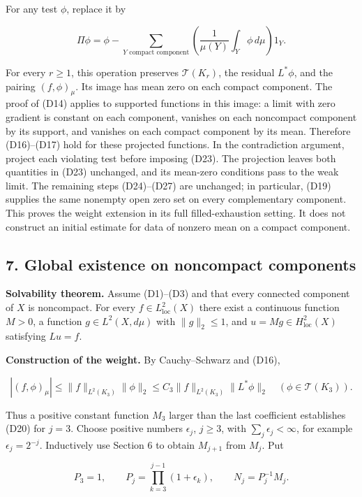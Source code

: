 \documentclass[
  11pt,
]{article}
\begin{document}
For any test \(\phi\), replace it by

\[
 \Pi\phi=\phi-\sum_{Y\text{ compact component}}
       \left(\frac{1}{\mu(Y)}\int_Y\phi\,d\mu\right)1_Y.
\]

For every \(r\geq1\), this operation preserves \(\mathcal T(K_r)\), the
residual \(L^*\phi\), and the pairing \((f,\phi)_\mu\). Its image has
mean zero on each compact component. The proof of (D14) applies to
supported functions in this image: a limit with zero gradient is
constant on each component, vanishes on each noncompact component by its
support, and vanishes on each compact component by its mean. Therefore
(D16)--(D17) hold for these projected functions. In the contradiction
argument, project each violating test before imposing (D23). The
projection leaves both quantities in (D23) unchanged, and its mean-zero
conditions pass to the weak limit. The remaining steps (D24)--(D27) are
unchanged; in particular, (D19) supplies the same nonempty open zero set
on every complementary component. This proves the weight extension in
its full filled-exhaustion setting. It does not construct an initial
estimate for data of nonzero mean on a compact component.

\subsection{7. Global existence on noncompact
components}\label{global-existence-on-noncompact-components}

\textbf{Solvability theorem.} Assume (D1)--(D3) and that every connected
component of \(X\) is noncompact. For every
\(f\in L^2_{\mathrm{loc}}(X)\) there exist a continuous function
\(M>0\), a function \(g\in L^2(X,d\mu)\) with \(\|g\|_2\leq1\), and
\(u=Mg\in H^2_{\mathrm{loc}}(X)\) satisfying \(Lu=f\).

\textbf{Construction of the weight.} By Cauchy--Schwarz and (D16),

\[
 |(f,\phi)_\mu|\leq\|f\|_{L^2(K_3)}\|\phi\|_2
                  \leq C_3\|f\|_{L^2(K_3)}\|L^*\phi\|_2
                    \quad(\phi\in\mathcal T(K_3)).               \tag{D28}
\]

Thus a positive constant function \(M_3\) larger than the last
coefficient establishes (D20) for \(j=3\). Choose positive numbers
\(\epsilon_j\), \(j\geq3\), with \(\sum_j\epsilon_j<\infty\), for
example \(\epsilon_j=2^{-j}\). Inductively use Section 6 to obtain
\(M_{j+1}\) from \(M_j\). Put

\[
 P_3=1,\qquad P_j=\prod_{k=3}^{j-1}(1+\epsilon_k),
 \qquad N_j=P_j^{-1}M_j.                                        \tag{D29}
\]
\end{document}
